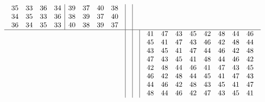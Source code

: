 \documentclass[12pt,a4paper]{amsart}
\begin{document}
\begin{align*}
\begin{array}{c|c|c|c}
\begin{array}{rrrr|rrrr}
35&33&36&34&39&37&40&38\\%
34&35&33&36&38&39&37&40\\%
36&34&35&33&40&38&39&37\\%
      \end{array}%
      &\\\hline
    &&&
\begin{array}{rrrrrrrr}%
41&47&43&45&42&48&44&46\\%
45&41&47&43&46&42&48&44\\%
43&45&41&47&44&46&42&48\\%
47&43&45&41&48&44&46&42\\%
42&48&44&46&41&47&43&45\\%
46&42&48&44&45&41&47&43\\%
44&46&42&48&43&45&41&47\\%
48&44&46&42&47&43&45&41\\%
\end{array}%
  \end{array}
\end{align*}
\end{document}
